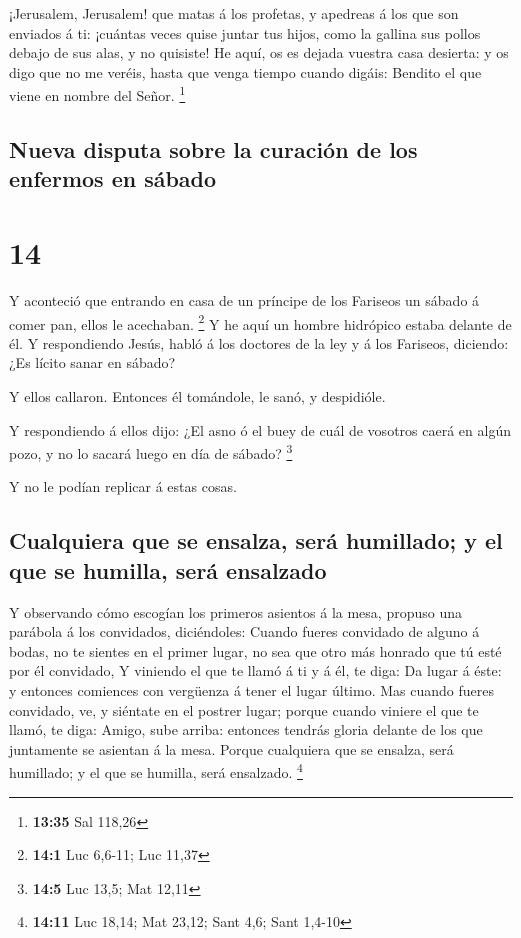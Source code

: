  ¡Jerusalem, Jerusalem! que matas á los profetas, y
apedreas á los que son enviados á ti: ¡cuántas veces quise juntar tus
hijos, como la gallina sus pollos debajo de sus alas, y no quisiste!
 He aquí, os es dejada vuestra casa desierta: y os digo
que no me veréis, hasta que venga tiempo cuando digáis: Bendito el que
viene en nombre del Señor. \footnote{\textbf{13:35} Sal 118,26}

\hypertarget{nueva-disputa-sobre-la-curaciuxf3n-de-los-enfermos-en-suxe1bado}{%
\subsection{Nueva disputa sobre la curación de los enfermos en
sábado}\label{nueva-disputa-sobre-la-curaciuxf3n-de-los-enfermos-en-suxe1bado}}

\hypertarget{section-13}{%
\section{14}\label{section-13}}

 Y aconteció que entrando en casa de un príncipe de los
Fariseos un sábado á comer pan, ellos le acechaban. \footnote{\textbf{14:1}
  Luc 6,6-11; Luc 11,37}  Y he aquí un hombre hidrópico
estaba delante de él.  Y respondiendo Jesús, habló á los
doctores de la ley y á los Fariseos, diciendo: ¿Es lícito sanar en
sábado?

 Y ellos callaron. Entonces él tomándole, le sanó, y
despidióle.

 Y respondiendo á ellos dijo: ¿El asno ó el buey de cuál
de vosotros caerá en algún pozo, y no lo sacará luego en día de sábado?
\footnote{\textbf{14:5} Luc 13,5; Mat 12,11}

 Y no le podían replicar á estas cosas.

\hypertarget{cualquiera-que-se-ensalza-seruxe1-humillado-y-el-que-se-humilla-seruxe1-ensalzado}{%
\subsection{Cualquiera que se ensalza, será humillado; y el que se
humilla, será
ensalzado}\label{cualquiera-que-se-ensalza-seruxe1-humillado-y-el-que-se-humilla-seruxe1-ensalzado}}

 Y observando cómo escogían los primeros asientos á la
mesa, propuso una parábola á los convidados, diciéndoles: 
Cuando fueres convidado de alguno á bodas, no te sientes en el primer
lugar, no sea que otro más honrado que tú esté por él convidado,
 Y viniendo el que te llamó á ti y á él, te diga: Da lugar
á éste: y entonces comiences con vergüenza á tener el lugar último.
 Mas cuando fueres convidado, ve, y siéntate en el
postrer lugar; porque cuando viniere el que te llamó, te diga: Amigo,
sube arriba: entonces tendrás gloria delante de los que juntamente se
asientan á la mesa.  Porque cualquiera que se ensalza,
será humillado; y el que se humilla, será ensalzado. \footnote{\textbf{14:11}
  Luc 18,14; Mat 23,12; Sant 4,6; Sant 1,4-10}

